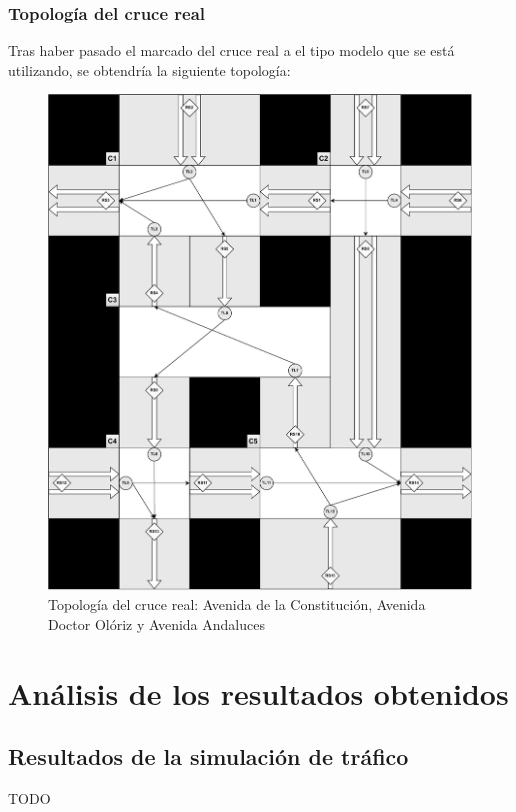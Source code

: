 \subsection{Topología del cruce real}
Tras haber pasado el marcado del cruce real a el tipo modelo que se está utilizando, se obtendría la siguiente topología:
\begin{figure}[H]
    \centering
    \includegraphics[width=1\linewidth]{text/image/DCruc-CReal-Topologia.pdf}
    \caption{Topología del cruce real: Avenida de la Constitución, Avenida Doctor Olóriz y Avenida Andaluces}
    \label{fig:cruce_real_topologia}
\end{figure}



\chapter{Análisis de los resultados obtenidos}
    \label{chap:seven}
    
\section{Resultados de la simulación de tráfico}
TODO


